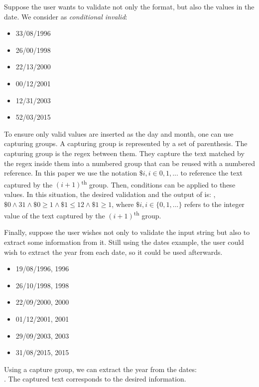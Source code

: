 Suppose the user wants to validate not only the format, but also the values in the date.
We consider as \textit{conditional invalid}:
\begin{multicols}{3}
    \begin{itemize}[label={}]
    \item 33/08/1996
    \item 26/00/1998
    \item 22/13/2000
    \item 00/12/2001
    \item 12/31/2003
    \item 52/03/2015
    \end{itemize}
\end{multicols}
To ensure only valid values are inserted as the day and month, one can use capturing groups. A capturing group is represented by a set of parenthesis. The capturing group is the regex between them. They capture the text matched by the regex inside them into a numbered group that can be reused with a numbered reference. In this paper we use the notation \(\$i, i \in 0, 1, ...\) to reference the text captured by the \((i+1)\)\textsuperscript{th} group.
Then, conditions can be applied to these values. In this situation, the desired validation and the output of \Forest is:
, \(\$0 \wedge 31 \wedge \$0 \ge 1 \wedge \$1 \le 12 \wedge \$1 \ge 1\), where \(\$i, i \in \{0, 1, ...\}\) refers to the integer value of the text captured by the \((i+1)\)\textsuperscript{th} group.

Finally, suppose the user wishes not only to validate the input string but also to extract some information from it. Still using the dates example, the user could wish to extract the year from each date, so it could be used afterwards.
\begin{multicols}{3}
    \begin{itemize}[label={}]
    \item 19/08/1996, 1996
    \item 26/10/1998, 1998
    \item 22/09/2000, 2000
    \item 01/12/2001, 2001
    \item 29/09/2003, 2003
    \item 31/08/2015, 2015
    \end{itemize}
\end{multicols}

Using a capture group, we can extract the year from the dates:\\ . The captured text corresponds to the desired information.

